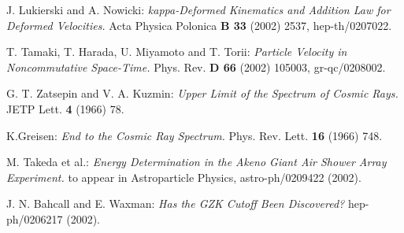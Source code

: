 \documentclass[a4paper,12pt]{article}
\begin{document}
\begin{thebibliography}{999}
 J. Lukierski and A. Nowicki:
{\it kappa-Deformed Kinematics and Addition Law for Deformed Velocities.}
Acta Physica Polonica {\bf B 33} (2002) 2537, hep-th/0207022.

 T. Tamaki, T. Harada, U. Miyamoto and T. Torii:
{\it Particle Velocity in Noncommutative Space-Time.}
Phys. Rev. {\bf D 66} (2002) 105003, gr-qc/0208002.

 G. T. Zatsepin and V. A. Kuzmin:
{\it  Upper Limit of the Spectrum of Cosmic Rays.}
JETP Lett. {\bf 4} (1966) 78.

K.Greisen:
{\it End to the Cosmic Ray Spectrum.}
Phys. Rev. Lett. {\bf 16} (1966) 748.

 M. Takeda et al.:
{\it Energy Determination in the Akeno Giant Air Shower Array Experiment.}
to appear in Astroparticle Physics, astro-ph/0209422 (2002).

 J. N. Bahcall and E. Waxman:
{\it Has the GZK Cutoff Been Discovered?}
hep-ph/0206217 (2002).

\end{thebibliography}
\end{document}

